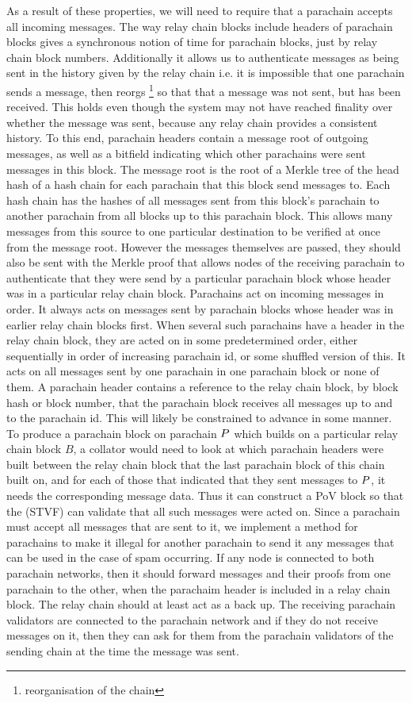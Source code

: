 As a result of these properties, we will need to require that a parachain accepts all incoming messages.
The way relay chain blocks include headers of parachain blocks gives a synchronous notion of time for parachain blocks,
just by relay chain block numbers. Additionally it allows us to authenticate messages as being sent in the history given by the relay chain
i.e. it is impossible that one parachain sends a message, then reorgs \footnote{reorganisation of the chain} so that that a message was not sent, but has been received. This holds even though the system may not have reached finality over whether the message was sent, because any relay chain provides a consistent history.
To this end, parachain headers contain a message root of outgoing messages, as well as a bitfield indicating which other parachains were sent messages in this block.
The message root is the root of a Merkle tree of the head hash of a hash chain for each parachain that this block send messages to.  Each hash chain has the hashes of all messages sent from this block's parachain to another parachain from all blocks up to this parachain block. This allows many messages from this source to one particular destination  to be verified at once from the message root.
However the messages themselves are passed, they should also be sent with the Merkle proof that allows nodes of the receiving parachain
to authenticate that they were send by a particular parachain block whose header was in a particular relay chain block. Parachains act on incoming messages in order. It always acts on messages sent by parachain blocks whose header was in earlier relay chain blocks first. When several such parachains have a header in the relay chain block, they are acted on in some predetermined order, either sequentially in order of increasing parachain id, or some shuffled version of this. It acts on all messages sent by one parachain in one parachain block or none of them. A parachain header contains a reference to the relay chain block, by block hash or block number, that the parachain block receives all messages up to and to the parachain id.
This will likely be constrained to advance in some manner. To produce a parachain block on parachain $P$ which builds on a particular relay chain block $B$,
a collator would need to look at which parachain headers were built between the relay chain block that the last parachain block of this chain built on,
and for each of those that indicated that they sent messages to $P$, it needs the corresponding message data.
Thus it can construct a PoV block so that the (STVF) can validate that all such messages were acted on. Since a parachain must accept all messages that are sent to it,
we implement a method for parachains to make it illegal for another parachain to send it any messages that can be used in the case of spam occurring. If any node is connected to both parachain networks, then it should forward messages and their proofs from one parachain to the other,
when the parachaim header is included in a relay chain block. The relay chain should at least act as a back up.
The receiving parachain validators are connected to the parachain network and if they do not receive messages on it, then they can ask for them from the parachain validators of the sending chain at the time the message was sent.

